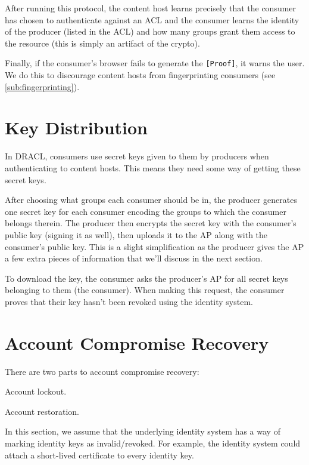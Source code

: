 \documentclass[pdftex,12pt,a4papaer,twoside,notitlepage]{report}
\begin{document}
After running this protocol, the content host learns precisely that the consumer
has chosen to authenticate against an ACL and the consumer learns the identity
of the producer (listed in the ACL) and how many groups grant them access to the
resource (this is simply an artifact of the crypto).

Finally, if the consumer's browser fails to generate the \verb=[Proof]=, it
warns the user. We do this to discourage content hosts from fingerprinting
consumers (see \ref{sub:fingerprinting}).

\section{Key Distribution}

In DRACL, consumers use secret keys given to them by producers when
authenticating to content hosts. This means they need some way of getting these
secret keys.

After choosing what groups each consumer should be in, the producer generates
one secret key for each consumer encoding the groups to which the consumer
belongs therein. The producer then encrypts the secret key with the consumer's
public key (signing it as well), then uploads it to the AP along with the
consumer's public key. This is a slight simplification as the producer gives the
AP a few extra pieces of information that we'll discuss in the next section.

To download the key, the consumer asks the producer's AP for all secret keys
belonging to them (the consumer). When making this request, the consumer proves
that their key hasn't been revoked using the identity system.

\section{Account Compromise Recovery}

There are two parts to account compromise recovery:

\begin{compactenum}
\item Account lockout.
\item Account restoration.
\end{compactenum}

In this section, we assume that the underlying identity system has a way of
marking identity keys as invalid/revoked. For example, the identity system could
attach a short-lived certificate to every identity key.
\end{document}
